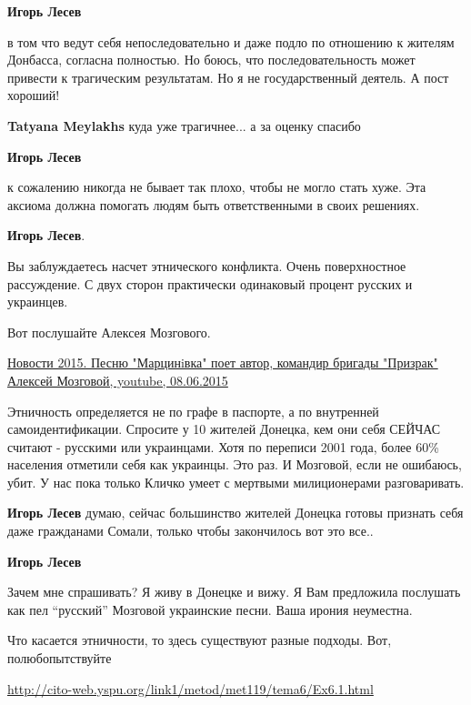 \begin{itemize}
\begin{itemize}
\textbf{Игорь Лесев} 

в том что ведут себя непоследовательно и даже подло по отношению к жителям
Донбасса, согласна полностью. Но боюсь, что последовательность может привести к
трагическим результатам. Но я не государственный деятель. А пост хороший!

\textbf{Tatyana Meylakhs} куда уже трагичнее... а за оценку спасибо

\textbf{Игорь Лесев} 

к сожалению никогда не бывает так плохо, чтобы не могло стать хуже. Эта аксиома
должна помогать людям быть ответственными в своих решениях.

\end{itemize} %

\textbf{Игорь Лесев}.

Вы заблуждаетесь насчет этнического конфликта. Очень поверхностное рассуждение. С
двух сторон практически одинаковый процент русских и украинцев.

Вот послушайте Алексея Мозгового.

\href{https://youtu.be/hEjCho4jz4g}{%
Новости 2015. Песню "Марцинiвка" поет автор, командир бригады "Призрак" Алексей Мозговой, youtube, %
08.06.2015%
}

\begin{itemize} %

Этничность определяется не по графе в паспорте, а по внутренней
самоидентификации. Спросите у 10 жителей Донецка, кем они себя СЕЙЧАС считают -
русскими или украинцами. Хотя по переписи 2001 года, более 60\% населения
отметили себя как украинцы. Это раз. И Мозговой, если не ошибаюсь, убит. У нас
пока только Кличко умеет с мертвыми милиционерами разговаривать.

\textbf{Игорь Лесев} думаю, сейчас большинство жителей Донецка готовы признать себя даже гражданами Сомали, только чтобы закончилось вот это все..

\textbf{Игорь Лесев} 

Зачем мне спрашивать? Я живу в Донецке и вижу. Я Вам предложила послушать как
пел \enquote{русский} Мозговой украинские песни. Ваша ирония неуместна.

Что касается этничности, то здесь существуют разные подходы. Вот, полюбопытствуйте

\url{http://cito-web.yspu.org/link1/metod/met119/tema6/Ex6.1.html}


\end{itemize}
\end{itemize}
